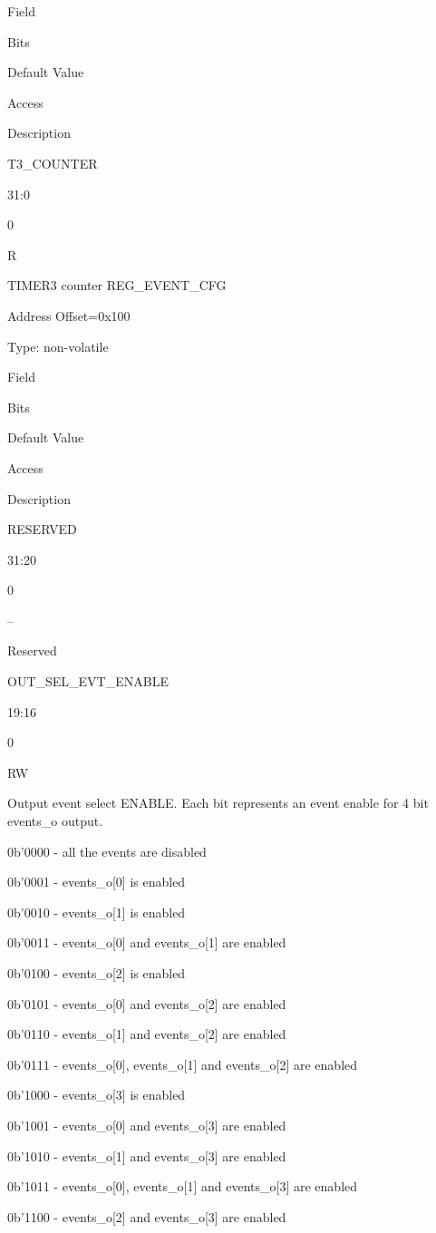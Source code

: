 Field
	

Bits
	

Default Value
	

Access
	

Description

T3_COUNTER
	

31:0
	

0
	

R
	

TIMER3 counter
REG_EVENT_CFG

    Address Offset=0x100

    Type: non-volatile

Field
	

Bits
	

Default Value
	

Access
	

Description

RESERVED
	

31:20
	

0
	

–
	

Reserved

OUT_SEL_EVT_ENABLE
	

19:16
	

0
	

RW
	

Output event select ENABLE. Each bit represents an event enable for 4 bit events_o output.

0b’0000 - all the events are disabled

0b’0001 - events_o[0] is enabled

0b’0010 - events_o[1] is enabled

0b’0011 - events_o[0] and events_o[1] are enabled

0b’0100 - events_o[2] is enabled

0b’0101 - events_o[0] and events_o[2] are enabled

0b’0110 - events_o[1] and events_o[2] are enabled

0b’0111 - events_o[0], events_o[1] and events_o[2] are enabled

0b’1000 - events_o[3] is enabled

0b’1001 - events_o[0] and events_o[3] are enabled

0b’1010 - events_o[1] and events_o[3] are enabled

0b’1011 - events_o[0], events_o[1] and events_o[3] are enabled

0b’1100 - events_o[2] and events_o[3] are enabled

